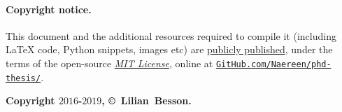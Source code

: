 



\vfill{}

\paragraph{Copyright notice.}
%
This document and the additional resources required to compile it (including \LaTeX{} code, Python snippets, images etc)
are \href{https://github.com/Naereen/phd-thesis/}{publicly published},
under the terms of the open-source \href{https://lbesson.mit-license.org/}{\emph{MIT License}},
online at \href{https://github.com/Naereen/phd-thesis/}{\texttt{GitHub.com/Naereen/phd-thesis/}}.


\begin{center}
    \textbf{Copyright $2016$-$2019$, \copyright ~Lilian~Besson.}
\end{center}
